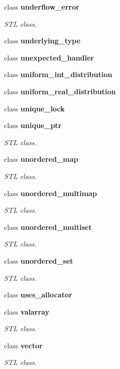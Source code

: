 \begin{DoxyCompactItemize}
\item 
class \textbf{ underflow\+\_\+error}
\begin{DoxyCompactList}\small\item\em S\+TL class. \end{DoxyCompactList}\item 
class \textbf{ underlying\+\_\+type}
\item 
class \textbf{ unexpected\+\_\+handler}
\item 
class \textbf{ uniform\+\_\+int\+\_\+distribution}
\item 
class \textbf{ uniform\+\_\+real\+\_\+distribution}
\item 
class \textbf{ unique\+\_\+lock}
\item 
class \textbf{ unique\+\_\+ptr}
\begin{DoxyCompactList}\small\item\em S\+TL class. \end{DoxyCompactList}\item 
class \textbf{ unordered\+\_\+map}
\begin{DoxyCompactList}\small\item\em S\+TL class. \end{DoxyCompactList}\item 
class \textbf{ unordered\+\_\+multimap}
\begin{DoxyCompactList}\small\item\em S\+TL class. \end{DoxyCompactList}\item 
class \textbf{ unordered\+\_\+multiset}
\begin{DoxyCompactList}\small\item\em S\+TL class. \end{DoxyCompactList}\item 
class \textbf{ unordered\+\_\+set}
\begin{DoxyCompactList}\small\item\em S\+TL class. \end{DoxyCompactList}\item 
class \textbf{ uses\+\_\+allocator}
\item 
class \textbf{ valarray}
\begin{DoxyCompactList}\small\item\em S\+TL class. \end{DoxyCompactList}\item 
class \textbf{ vector}
\begin{DoxyCompactList}\small\item\em S\+TL class. \end{DoxyCompactList}\item 

\end{DoxyCompactItemize}
